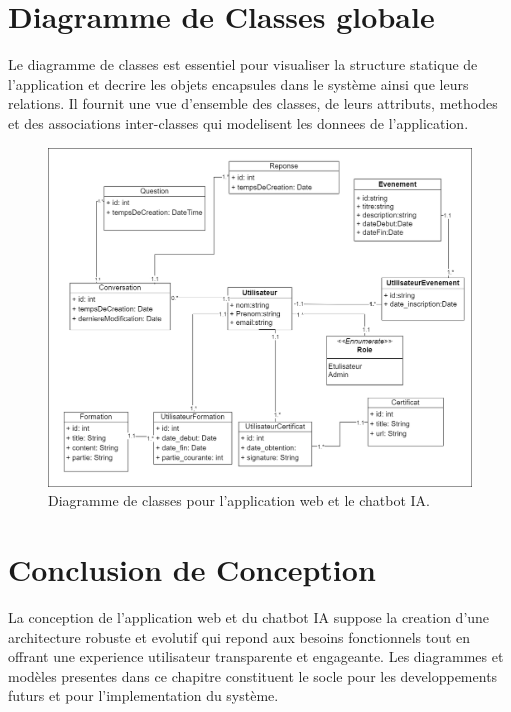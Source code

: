 \documentclass[a4paper, 11pt, openany]{report}
\begin{document}
\section{Diagramme de Classes globale}

Le diagramme de classes est essentiel pour visualiser la structure statique de l'application et decrire les objets encapsules dans le système ainsi que leurs relations. Il fournit une vue d'ensemble des classes, de leurs attributs, methodes et des associations inter-classes qui modelisent les donnees de l'application.

\clearpage
\begin{figure}[h!]
\centering
\includegraphics[width=\textwidth]{assets/images/class.png}
\caption{Diagramme de classes pour l'application web et le chatbot IA.}
\label{fig:class_diagram}
\end{figure}

\section{Conclusion de Conception}
La conception de l'application web et du chatbot IA suppose la creation d'une architecture robuste et evolutif qui repond aux besoins fonctionnels tout en offrant une experience utilisateur transparente et engageante. Les diagrammes et modèles presentes dans ce chapitre constituent le socle pour les developpements futurs et pour l'implementation du système.
\end{document}
